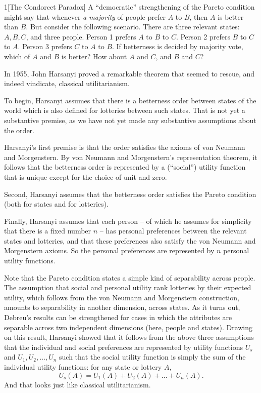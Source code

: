 \begin{exercise}{1}[The Condorcet Paradox]
  A ``democratic'' strengthening of the Pareto condition might say that whenever
  \emph{a majority} of people prefer $A$ to $B$, then $A$ is better than $B$.
  But consider the following scenario. There are three relevant states: $A,B,C$,
  and three people. Person 1 prefers $A$ to $B$ to $C$. Person 2 prefers $B$ to
  $C$ to $A$. Person 3 prefers $C$ to $A$ to $B$. If betterness is decided by
  majority vote, which of $A$ and $B$ is better? How about $A$ and $C$, and $B$
  and $C$?
\end{exercise}

In 1955, John Harsanyi proved a remarkable theorem that seemed to
rescue, and indeed vindicate, classical utilitarianism. 

To begin, Harsanyi assumes that there is a betterness order
between states of the world which is also defined for lotteries between
such states. That is not yet a substantive premise, as we have not yet
made any substantive assumptions about the order. 

Harsanyi's first premise is that the order satisfies the axioms of von
Neumann and Morgenstern. By von Neumann and Morgenstern's
representation theorem, it follows that the betterness order is
represented by a (``social'') utility function that is unique except
for the choice of unit and zero.

Second, Harsanyi assumes that the betterness order satisfies the
Pareto condition (both for states and for lotteries).

Finally, Harsanyi assumes that each person -- of which he assumes for simplicity
that there is a fixed number $n$ -- has personal preferences between the
relevant states and lotteries, and that these preferences also satisfy the von
Neumann and Morgenstern axioms. So the personal preferences  are represented
by $n$ personal utility functions.

Note that the Pareto condition states a simple kind of separability
across people. The assumption that social and personal utility rank
lotteries by their expected utility, which follows from the von
Neumann and Morgenstern construction, amounts to separability in
another dimension, across states. As it turns out, Debreu's results
can be strengthened for cases in which the attributes are separable
across two independent dimensions (here, people and states). Drawing
on this result, Harsanyi showed that it follows from the above three
assumptions that the individual and social preferences are represented
by utility functions $U_s$ and $U_1,U_2,\ldots,U_n$ such that the
social utility function is simply the sum of the individual utility
functions: for any state or lottery $A$,
\[
  U_s(A) = U_1(A) + U_2(A) + \ldots + U_n(A).
\]
And that looks just like classical utilitarianism.

